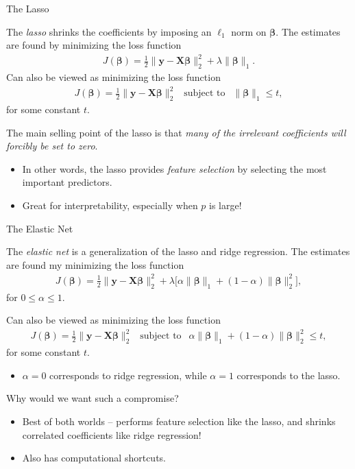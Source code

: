 \documentclass[8pt]{beamer}
\newcommand{\mydef}[1]{\textcolor{SteelBlue3}{\textit{#1}}} %
\begin{document}
\begin{frame}{The Lasso}

The \mydef{lasso} \cite{tibshirani1996regression} shrinks the coefficients by imposing an $\ell_1$ norm on $\bm{\beta}$. The estimates are found by minimizing the loss function
\begin{align*}
    J(\bm{\beta}) = \frac{1}{2} \| \mathbf{y}  - \mathbf{X} \bm{\beta} \|_2^2 + \lambda \| \bm{\beta} \|_1.
\end{align*} %
Can also be viewed as minimizing the loss function 
\begin{align*}
    J(\bm{\beta}) = \frac{1}{2} \| \mathbf{y}  - \mathbf{X} \bm{\beta} \|_2^2 ~~\text{ subject to }~~ \| \bm{\beta} \|_1 \le t,
\end{align*}
for some constant $t$. %

The main selling point of the lasso is that \textit{many of the irrelevant coefficients will forcibly be set to zero}. %
\begin{itemize}
    \item In other words, the lasso provides \mydef{feature selection} by selecting the most important predictors. %
    \item Great for interpretability, especially when $p$ is large!
\end{itemize}

    
\end{frame}

\begin{frame}{The Elastic Net}

The \mydef{elastic net} \cite{zou2005regularization} is a generalization of the lasso and ridge regression. The estimates are found my minimizing the loss function 
\begin{align*}
    J(\bm{\beta}) = \frac{1}{2} \| \mathbf{y}  - \mathbf{X} \bm{\beta} \|_2^2 + \lambda \Big[ \alpha \| \bm{\beta} \|_1 + (1 - \alpha) \| \bm{\beta} \|_2^2 \Big],
\end{align*}
for $0 \le \alpha \le 1$. %

Can also be viewed as minimizing the loss function 
\begin{align*}
    J(\bm{\beta}) = \frac{1}{2} \| \mathbf{y}  - \mathbf{X} \bm{\beta} \|_2^2 ~~\text{ subject to }~~ \alpha \| \bm{\beta} \|_1 + (1 - \alpha) \| \bm{\beta} \|_2^2\le t,
\end{align*}
for some constant $t$. %
\begin{itemize}
    \item $\alpha = 0$ corresponds to ridge regression, while $\alpha = 1$ corresponds to the lasso. %
\end{itemize}

Why would we want such a compromise? %
\begin{itemize}
    \item Best of both worlds -- performs feature selection like the lasso, and shrinks correlated coefficients like ridge regression! %
    \item Also has computational shortcuts. 
\end{itemize}
    
\end{frame}
\end{document}
